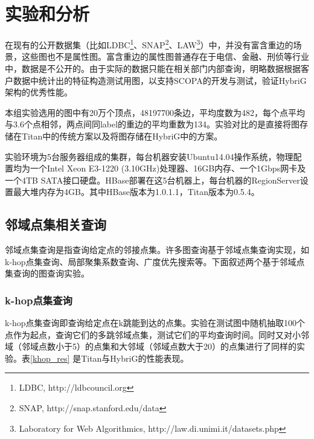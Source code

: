 
\chapter{实验和分析} \label{chap:experiments}
在现有的公开数据集（比如LDBC\footnote{LDBC, http://ldbcouncil.org}、SNAP\footnote{SNAP, http://snap.stanford.edu/data}、LAW\footnote{Laboratory for Web Algorithmics, http://law.di.unimi.it/datasets.php}）中，并没有富含重边的场景，这些图也不是属性图。富含重边的属性图普通存在于电信、金融、刑侦等行业中，数据是不公开的。由于实际的数据只能在相关部门内部查询，明略数据根据客户数据中统计出的特征构造测试用图，以支持SCOPA的开发与测试，验证HybriG架构的优秀性能。

本组实验选用的图中有20万个顶点，48197700条边，平均度数为482，每个点平均与3.6个点相邻，两点间同label的重边的平均重数为134。实验对比的是直接将图存储在Titan中的传统方案以及将图存储在HybriG中的方案。

实验环境为5台服务器组成的集群，每台机器安装Ubuntu14.04操作系统，物理配置均为一个Intel Xeon E3-1220 (3.10GHz)处理器、16GB内存、一个1Gbps网卡及一个4TB SATA接口硬盘。HBase部署在这5台机器上，每台机器的RegionServer设置最大堆内存为4GB。其中HBase版本为1.0.1.1，Titan版本为0.5.4。

\section{邻域点集相关查询}
邻域点集查询是指查询给定点的邻接点集。许多图查询基于邻域点集查询实现，如k-hop点集查询、局部聚集系数查询、广度优先搜索等。下面叙述两个基于邻域点集查询的图查询实验。
\subsection{k-hop点集查询}
k-hop点集查询即查询给定点在k跳能到达的点集。实验在测试图中随机抽取100个点作为起点，查询它们的多跳邻域点集，测试它们的平均查询时间。同时又对小邻域（邻域点数小于5）的点集和大邻域（邻域点数大于20）的点集进行了同样的实验。表\ref{khop_res} 是Titan与HybriG的性能表现。

